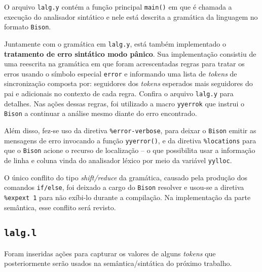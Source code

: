 O arquivo \texttt{lalg.y} contém a função principal \texttt{main()} em que é chamada a execução do analisador sintático e nele está descrita a gramática da linguagem no formato \texttt{Bison}.

Juntamente com o gramática em \texttt{lalg.y}, está também implementado o \textbf{tratamento de erro sintático modo pânico}. Sua implementação consistiu de uma reescrita na gramática em que foram acrescentadas regras para tratar os erros usando o símbolo especial \texttt{error} e informando uma lista de \textit{tokens} de sincronização composta por: seguidores dos \textit{tokens} esperados mais seguidores do pai e adicionais no contexto de cada regra. Confira o arquivo \texttt{lalg.y} para detalhes. Nas ações dessas regras, foi utilizado a macro \texttt{yyerrok} que instrui o \texttt{Bison} a continuar a análise mesmo diante do erro encontrado.

\newpage
Além disso, fez-se uso da diretiva \texttt{\%error-verbose}, para deixar o \texttt{Bison} emitir as mensagens de erro invocando a função \texttt{yyerror()}, e da diretiva \texttt{\%locations} para que o \texttt{Bison} acione o recurso de localização -- o que possibilita usar a informação de linha e coluna vinda do analisador léxico por meio da variável \texttt{yylloc}.

O único conflito do tipo \textit{shift/reduce} da gramática, causado pela produção dos comandos \texttt{if/else}, foi deixado a cargo do \texttt{Bison} resolver e usou-se a diretiva \texttt{\%expext 1} para não exíbi-lo durante a compilação. Na implementação da parte semântica, esse conflito será revisto.

\subsection{\texttt{lalg.l}}

Foram inseridas ações para capturar os valores de alguns \textit{tokens} que posteriormente serão usados na semântica/sintática do próximo trabalho.